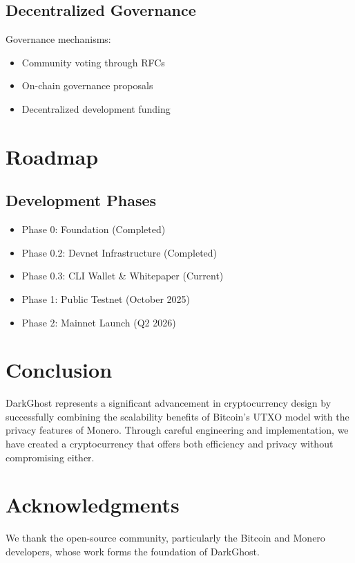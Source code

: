 \documentclass[11pt]{article}
\begin{document}
\subsection{Decentralized Governance}
Governance mechanisms:
\begin{itemize}
    \item Community voting through RFCs
    \item On-chain governance proposals
    \item Decentralized development funding
\end{itemize}

\section{Roadmap}
\subsection{Development Phases}
\begin{itemize}
    \item Phase 0: Foundation (Completed)
    \item Phase 0.2: Devnet Infrastructure (Completed)
    \item Phase 0.3: CLI Wallet \& Whitepaper (Current)
    \item Phase 1: Public Testnet (October 2025)
    \item Phase 2: Mainnet Launch (Q2 2026)
\end{itemize}

\section{Conclusion}
DarkGhost represents a significant advancement in cryptocurrency design by successfully combining the scalability benefits of Bitcoin's UTXO model with the privacy features of Monero. Through careful engineering and implementation, we have created a cryptocurrency that offers both efficiency and privacy without compromising either.

\section*{Acknowledgments}
We thank the open-source community, particularly the Bitcoin and Monero developers, whose work forms the foundation of DarkGhost.
\end{document}
